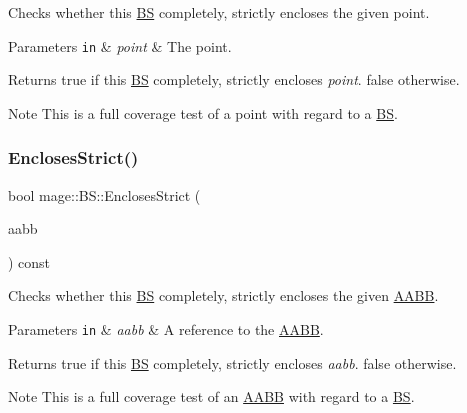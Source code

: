 Checks whether this \hyperlink{classmage_1_1_b_s}{BS} completely, strictly encloses the given point.


\begin{DoxyParams}[1]{Parameters}
\mbox{\tt in}  & {\em point} & The point. \\
\hline
\end{DoxyParams}
\begin{DoxyReturn}{Returns}
{\ttfamily true} if this \hyperlink{classmage_1_1_b_s}{BS} completely, strictly encloses {\itshape point}. {\ttfamily false} otherwise. 
\end{DoxyReturn}
\begin{DoxyNote}{Note}
This is a full coverage test of a point with regard to a \hyperlink{classmage_1_1_b_s}{BS}. 
\end{DoxyNote}
\hypertarget{classmage_1_1_b_s_a5172470cadb43af2015e351ab6d4e8b6}{}\label{classmage_1_1_b_s_a5172470cadb43af2015e351ab6d4e8b6} 
\subsubsection{\texorpdfstring{Encloses\+Strict()}{EnclosesStrict()}\hspace{0.1cm}{\footnotesize\ttfamily [3/4]}}
{\footnotesize\ttfamily bool mage\+::\+B\+S\+::\+Encloses\+Strict (\begin{DoxyParamCaption}\item[{const \hyperlink{classmage_1_1_a_a_b_b}{A\+A\+BB} \&}]{aabb }\end{DoxyParamCaption}) const\hspace{0.3cm}{\ttfamily [noexcept]}}

Checks whether this \hyperlink{classmage_1_1_b_s}{BS} completely, strictly encloses the given \hyperlink{classmage_1_1_a_a_b_b}{A\+A\+BB}.


\begin{DoxyParams}[1]{Parameters}
\mbox{\tt in}  & {\em aabb} & A reference to the \hyperlink{classmage_1_1_a_a_b_b}{A\+A\+BB}. \\
\hline
\end{DoxyParams}
\begin{DoxyReturn}{Returns}
{\ttfamily true} if this \hyperlink{classmage_1_1_b_s}{BS} completely, strictly encloses {\itshape aabb}. {\ttfamily false} otherwise. 
\end{DoxyReturn}
\begin{DoxyNote}{Note}
This is a full coverage test of an \hyperlink{classmage_1_1_a_a_b_b}{A\+A\+BB} with regard to a \hyperlink{classmage_1_1_b_s}{BS}. 
\end{DoxyNote}
\hypertarget{classmage_1_1_b_s_ab0692e25e9cfe45eb3c6003f5fc8de9f}{}\label{classmage_1_1_b_s_ab0692e25e9cfe45eb3c6003f5fc8de9f} 
